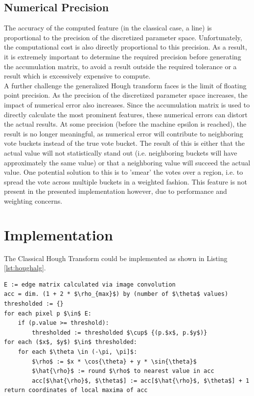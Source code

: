 \documentclass[letterpaper,12pt]{article}
\begin{document}
\subsection{Numerical Precision}
The accuracy of the computed feature (in the classical case, a line) is proportional to the
precision of the discretized parameter space. Unfortunately, the computational cost is also
directly proportional to this precision. As a result, it is extremely important to determine
the required precision before generating the accumulation matrix, to avoid a result outside
the required tolerance or a result which is excessively expensive to compute.
\\
A further challenge the generalized Hough transform faces is the limit of floating point
precision. As the precision of the discretized parameter space increases, the impact of
numerical error also increases. Since the accumulation matrix is used to directly calculate
the most prominent features, these numerical errors can distort the actual results. At some
precision (before the machine epsilon is reached), the result is no longer meaningful, as
numerical error will contribute to neighboring vote buckets instead of the true vote bucket.
The result of this is either that the actual value will not statistically stand out
(i.e. neighboring buckets will have approximately the same value) or that a neighboring value
will succeed the actual value. One potential solution to this is to 'smear' the votes over a
region, i.e. to spread the vote across multiple buckets in a weighted fashion. This feature
is not present in the presented implementation however, due to performance and weighting concerns.

\section{Implementation}
The Classical Hough Transform could be implemented as shown in Listing \ref{lst:houghalg}.

\begin{lstlisting}[frame=tb,mathescape,caption={Hough transform algorithm},label={lst:houghalg}]
E := edge matrix calculated via image convolution
acc = dim. (1 + 2 * $\rho_{max}$) by (number of $\theta$ values)
thresholded := {}
for each pixel p $\in$ E:
    if (p.value >= threshold):
        thresholded := thresholded $\cup$ {(p.$x$, p.$y$)}
for each ($x$, $y$) $\in$ thresholded:
    for each $\theta \in (-\pi, \pi]$:
        $\rho$ := $x * \cos{\theta} + y * \sin{\theta}$
        $\hat{\rho}$ := round $\rho$ to nearest value in acc
        acc[$\hat{\rho}$, $\theta$] := acc[$\hat{\rho}$, $\theta$] + 1
return coordinates of local maxima of acc
\end{lstlisting}
\end{document}
